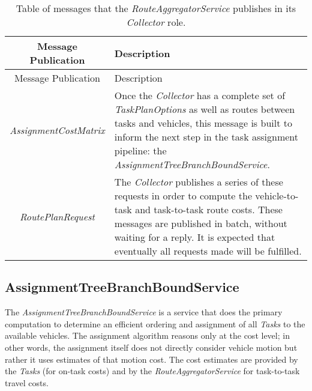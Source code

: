 \begin{longtable}[]{@{}cl@{}}
\caption{Table of messages that the \emph{RouteAggregatorService}
publishes in its \emph{Collector} role.}\tabularnewline
\toprule
\begin{minipage}[b]{0.40\columnwidth}\centering\strut
Message Publication\strut
\end{minipage} & \begin{minipage}[b]{0.55\columnwidth}\raggedright\strut
Description\strut
\end{minipage}\tabularnewline
\midrule
\endfirsthead
\toprule
\begin{minipage}[b]{0.40\columnwidth}\centering\strut
Message Publication\strut
\end{minipage} & \begin{minipage}[b]{0.55\columnwidth}\raggedright\strut
Description\strut
\end{minipage}\tabularnewline
\midrule
\endhead
\begin{minipage}[t]{0.40\columnwidth}\centering\strut
\emph{AssignmentCostMatrix}\strut
\end{minipage} & \begin{minipage}[t]{0.55\columnwidth}\raggedright\strut
Once the \emph{Collector} has a complete set of \emph{TaskPlanOptions}
as well as routes between tasks and vehicles, this message is built to
inform the next step in the task assignment pipeline: the
\emph{AssignmentTreeBranchBoundService}.\strut
\end{minipage}\tabularnewline
\begin{minipage}[t]{0.40\columnwidth}\centering\strut
\emph{RoutePlanRequest}\strut
\end{minipage} & \begin{minipage}[t]{0.55\columnwidth}\raggedright\strut
The \emph{Collector} publishes a series of these requests in order to
compute the vehicle-to-task and task-to-task route costs. These messages
are published in batch, without waiting for a reply. It is expected that
eventually all requests made will be fulfilled.\strut
\end{minipage}\tabularnewline
\bottomrule
\end{longtable}

\subsection{AssignmentTreeBranchBoundService}\label{assignmenttreebranchboundservice}

The \emph{AssignmentTreeBranchBoundService} is a service that does the
primary computation to determine an efficient ordering and assignment of
all \emph{Tasks} to the available vehicles. The assignment algorithm
reasons only at the cost level; in other words, the assignment itself
does not directly consider vehicle motion but rather it uses estimates
of that motion cost. The cost estimates are provided by the \emph{Tasks}
(for on-task costs) and by the \emph{RouteAggregatorService} for
task-to-task travel costs.

